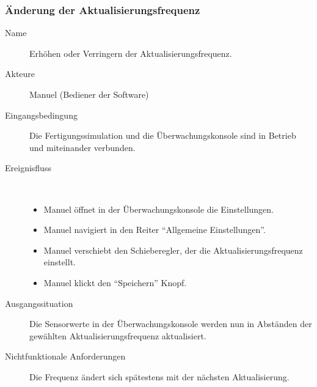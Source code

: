 \documentclass[parskip=full]{scrartcl}
\begin{document}
\subsubsection{Änderung der Aktualisierungsfrequenz}
\begin{description}
 \item[Name] Erhöhen oder Verringern der Aktualisierungsfrequenz.
 \item[Akteure] Manuel (Bediener der Software)
 \item[Eingangsbedingung] Die Fertigungssimulation und die Überwachungskonsole sind in Betrieb und miteinander verbunden.
 \item[Ereignisfluss]~\\
 \begin{itemize}[noitemsep]
  \item Manuel öffnet in der Überwachungskonsole die Einstellungen.
  \item Manuel navigiert in den Reiter ``Allgemeine Einstellungen''.
  \item Manuel verschiebt den Schieberegler, der die Aktualisierungsfrequenz einstellt.
  \item Manuel klickt den ``Speichern'' Knopf.
 \end{itemize}
 \item[Ausgangssituation] Die Sensorwerte in der Überwachungskonsole werden nun in Abständen der gewählten Aktualisierungsfrequenz aktualisiert.
 \item [Nichtfunktionale Anforderungen] Die Frequenz ändert sich spätestens mit der nächsten Aktualisierung.
\end{description}
\end{document}
